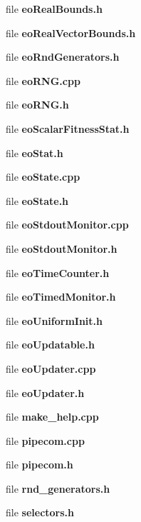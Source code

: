 \begin{CompactItemize}
file {\bf eoRealBounds.h}
\item 
file {\bf eoRealVectorBounds.h}
\item 
file {\bf eoRndGenerators.h}
\item 
file {\bf eoRNG.cpp}
\item 
file {\bf eoRNG.h}
\item 
file {\bf eoScalarFitnessStat.h}
\item 
file {\bf eoStat.h}
\item 
file {\bf eoState.cpp}
\item 
file {\bf eoState.h}
\item 
file {\bf eoStdoutMonitor.cpp}
\item 
file {\bf eoStdoutMonitor.h}
\item 
file {\bf eoTimeCounter.h}
\item 
file {\bf eoTimedMonitor.h}
\item 
file {\bf eoUniformInit.h}
\item 
file {\bf eoUpdatable.h}
\item 
file {\bf eoUpdater.cpp}
\item 
file {\bf eoUpdater.h}
\item 
file {\bf make_help.cpp}
\item 
file {\bf pipecom.cpp}
\item 
file {\bf pipecom.h}
\item 
file {\bf rnd_generators.h}
\item 
file {\bf selectors.h}
\end{CompactItemize}
